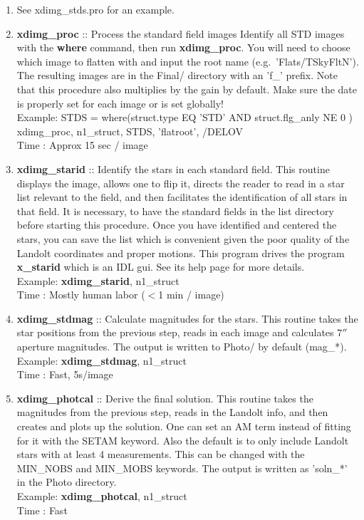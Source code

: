 \documentclass[11pt,letterpaper,dvips]{article}
\begin{document}
\begin{enumerate}
	\begin{enumerate}

	  \item See xdimg\_stds.pro for an example.
	  \item {\bf xdimg\_proc } :: Process the standard field images 
		Identify all STD images with the {\bf where} command, then
		run {\bf xdimg\_proc}.   You will need to choose which image to
		flatten with and input the root name (e.g.\ 'Flats/TSkyFltN').
		The resulting
		images are in the Final/ directory with an 'f\_' prefix.  
		Note that this procedure
		also multiplies by the gain by default.  Make sure the 
		date is properly set for each image or is set globally! \\
  		\quad Example: STDS = where(struct.type EQ 'STD' AND 
			struct.flg\_anly NE 0 ) \\
	    	\quad\quad\quad xdimg\_proc, n1\_struct, STDS, 'flatroot', /DELOV \\
	        \quad Time   : Approx 15 sec / image 

	  \item {\bf xdimg\_starid} :: Identify the stars in each standard field. 
		This routine displays the image, allows one to flip it, 
		directs the reader to read in a star list relevant to the
		field, and then facilitates the identification of all stars
		in that field.  It is necessary, to 
		have the standard fields in the list 
		directory before starting this procedure.  Once you have
		identified and centered the stars, you can save the list
		which is convenient given the poor quality of the 
		Landolt coordinates and proper motions.  This program drives
		the program {\bf x\_starid} which is an IDL gui.  See its help
		page for more details. \\
		\quad Example: {\bf xdimg\_starid}, n1\_struct \\
	        \quad Time   : Mostly human labor ($<$1 min / image)

	  \item {\bf xdimg\_stdmag} :: Calculate magnitudes for the stars.  This 
		routine takes the star positions from the previous step, 
		reads in each image and calculates $7''$ aperture magnitudes.
		The output is written to Photo/ by default (mag\_*).\\
         	\quad Example: {\bf xdimg\_stdmag}, n1\_struct \\
	        \quad Time   : Fast, 5s/image

	  \item {\bf xdimg\_photcal} :: Derive the final solution.  This routine
		takes the magnitudes from the previous step, reads in the
		Landolt info, and then creates and plots up the solution.  
		One can set an AM
		term instead of fitting for it with the SETAM keyword.  Also
		the default is to only include Landolt stars with at least
		4 measurements.  This can be changed with the MIN\_NOBS and
		MIN\_MOBS keywords.  The output is written as 'soln\_*' in
		the Photo directory.  \\
         	\quad Example: {\bf xdimg\_photcal}, n1\_struct \\
	        \quad Time   : Fast


\end{enumerate}
\end{enumerate}
\end{document}
